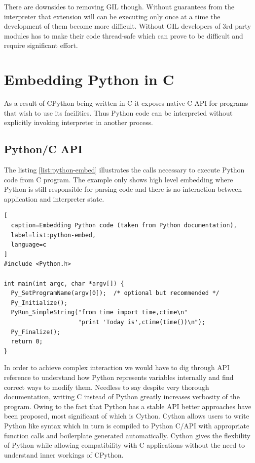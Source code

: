 \documentclass[12pt, a4paper]{report}
\begin{document}
There are downsides to removing GIL though. Without guarantees from
the interpreter that extension will can be executing only once at
a time the development of them become more difficult. Without GIL
developers of 3rd party modules has to make their code thread-safe
which can prove to be difficult and require significant effort.

\section{Embedding Python in C}\label{sec:python-embedding}
As a result of CPython being written in C it exposes native C API for
programs that wish to use its facilities. Thus Python code can be
interpreted without explicitly invoking interpreter in another process.

\subsection{Python/C API}\label{subsec:python-capi}
The listing \ref{list:python-embed} illustrates the calls necessary
to execute Python code from C program. The example only shows
high level embedding where Python is still responsible for parsing
code and there is no interaction between application and interpreter
state.

\begin{lstlisting}[
  caption=Embedding Python code (taken from Python documentation),
  label=list:python-embed,
  language=c
]
#include <Python.h>

int main(int argc, char *argv[]) {
  Py_SetProgramName(argv[0]);  /* optional but recommended */
  Py_Initialize();
  PyRun_SimpleString("from time import time,ctime\n"
                     "print 'Today is',ctime(time())\n");
  Py_Finalize();
  return 0;
}
\end{lstlisting}

In order to achieve complex interaction we would have to dig
through API reference to understand how Python represents variables
internally and find correct ways to modify them. Needless to say
despite very thorough documentation, writing C instead of Python
greatly increases verbosity of the program. Owing to the fact
that Python has a stable API better approaches have been proposed,
most significant of which is Cython. Cython allows users to write
Python like syntax which in turn is compiled to Python C/API
with appropriate function calls and boilerplate generated
automatically. Cython gives the flexbility of Python while allowing
compatibility with C applications without the need to understand
inner workings of CPython.
\end{document}
